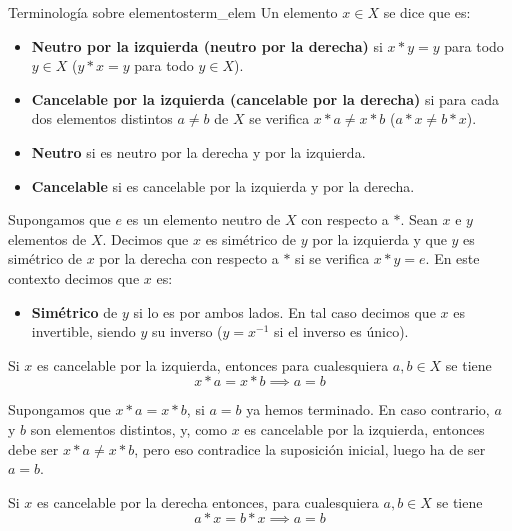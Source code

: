 \begin{definition}{Terminología sobre elementos}{term_elem}
    Un elemento \(x\in X\) se dice que es:
    \begin{itemize}
        \item \textbf{Neutro por la izquierda (neutro por la derecha)} si \(x*y=y\) para todo \(y\in X\) (\(y*x=y\) para todo \(y\in X\)).
        
        \item \textbf{Cancelable por la izquierda (cancelable por la derecha)} si para cada dos elementos distintos \(a \neq b\) de \(X\) se verifica \(x*a\neq x*b\) (\(a*x\neq b*x\)).
        
        \item \textbf{Neutro} si es neutro por la derecha y por la izquierda.

        \item \textbf{Cancelable} si es cancelable por la izquierda y por la derecha.
    \end{itemize}

    Supongamos que \(e\) es un elemento neutro de \(X\) con respecto a \(*\). Sean \(x\) e \(y\) elementos de \(X\). Decimos que \(x\) es simétrico de \(y\) por la izquierda y que \(y\) es simétrico de \(x\) por la derecha con respecto a \(*\) si se verifica \(x*y=e\). En este contexto decimos que $x$ es:
    \begin{itemize}
        \item \textbf{Simétrico} de $y$ si lo es por ambos lados. En tal caso decimos que $x$ es invertible, siendo $y$ su inverso ($y = x^{-1}$ si el inverso es único).
    \end{itemize}
\end{definition}

\begin{example}{}{}
    Si $x$ es cancelable por la izquierda, entonces para cualesquiera $a,b \in X$ se tiene
    \[
    x * a = x * b \implies a = b
    \]
\end{example}

\begin{proofbox}
    Supongamos que $x * a = x * b$, si $a = b$ ya hemos terminado. En caso contrario, $a$ y $b$ son elementos distintos, y, como $x$ es cancelable por la izquierda, entonces debe ser $x * a \neq x * b$, pero eso contradice la suposición inicial, luego ha de ser $a = b$.
\end{proofbox}

\begin{example}{}{}
Si $x$ es cancelable por la derecha entonces, para cualesquiera $a,b \in X$ se tiene
    \[
    a * x = b * x \implies a = b
    \]
\end{example}

